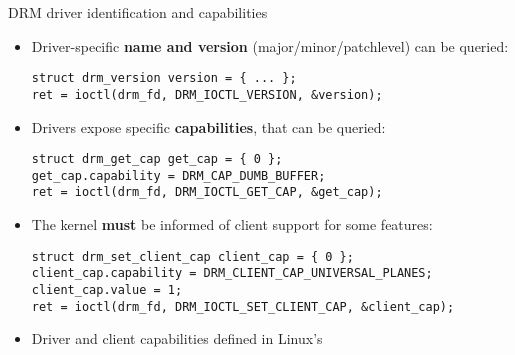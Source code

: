 \begin{frame}[fragile]{DRM driver identification and capabilities}
  \begin{itemize}
  \item Driver-specific \textbf{name and version} (major/minor/patchlevel) can be queried:%
  \begin{verbatim}
struct drm_version version = { ... };
ret = ioctl(drm_fd, DRM_IOCTL_VERSION, &version);
  \end{verbatim}
  \item Drivers expose specific \textbf{capabilities}, that can be queried:
  \begin{verbatim}
struct drm_get_cap get_cap = { 0 };
get_cap.capability = DRM_CAP_DUMB_BUFFER;
ret = ioctl(drm_fd, DRM_IOCTL_GET_CAP, &get_cap);
  \end{verbatim}
  \item The kernel \textbf{must} be informed of client support for some features:
  \begin{verbatim}
struct drm_set_client_cap client_cap = { 0 };
client_cap.capability = DRM_CLIENT_CAP_UNIVERSAL_PLANES;
client_cap.value = 1;
ret = ioctl(drm_fd, DRM_IOCTL_SET_CLIENT_CAP, &client_cap);
  \end{verbatim}
  \item Driver and client capabilities defined in Linux's 
  \end{itemize}
\end{frame}

